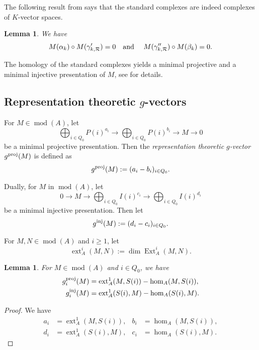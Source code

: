 \documentclass[12pt,reqno]{amsart}
\newtheorem{Lem}[Thm]{Lemma}
\theoremstyle{definition}
\newcommand{\cR}{{\mathcal R}}
\newcommand{\md}{\operatorname{mod}}
\newcommand{\Ext}{\operatorname{Ext}}
\newcommand{\ext}{\operatorname{ext}}
\begin{document}
The following result from \cite[Section~5]{GHLS26} says that the standard complexes are indeed 
complexes of $K$-vector spaces.

\begin{Lem}\label{lem:complex1}
We have
$$
M(\alpha_k) \circ M(\gamma_{k,\cR}') = 0 
\text{\quad and \quad}
M(\gamma_{k,\cR}'') \circ M(\beta_k) = 0.
$$
\end{Lem}

The homology of the standard complexes yields a minimal
projective and a minimal injective presentation of $M$, see \cite[Theorem~1.1]{GHLS26} for details.



\subsection{Representation theoretic $g$-vectors}
For $M \in \md(A)$, let
\[
\bigoplus_{i \in Q_0} P(i)^{a_i} \to 
\bigoplus_{i \in Q_0} P(i)^{b_i} \to M \to 0
\]
be a minimal projective presentation.
Then the \emph{representation theoretic $g$-vector} $g^{\rm proj}(M)$ is defined as
$$
g^{\rm proj}(M) := (a_i-b_i)_{i \in Q_0}.
$$

Dually, for $M$ in $\md(A)$,
let
\[
0 \to M \to \bigoplus_{i \in Q_0} I(i)^{c_i} \to \bigoplus_{i \in Q_0} 
I(i)^{d_i} 
\]
be a minimal injective presentation. 
Then let 
$$
g^{\rm inj}(M) := (d_i-c_i)_{i \in Q_0}.
$$

For $M,N \in \md(A)$ and $i \ge 1$, let
$$
\ext_A^i(M,N) := \dim \Ext_A^i(M,N).
$$

\begin{Lem}\label{lem:gvector1}
For $M \in \md(A)$ and $i \in Q_0$, we have
\begin{align*}
g_i^{\rm proj}(M) &= \ext_A^1(M,S(i)) - \hom_A(M,S(i)),
\\
g_i^{\rm inj}(M) &= \ext_A^1(S(i),M) - \hom_A(S(i),M).
\end{align*}
\end{Lem}

\begin{proof}
We have 
\begin{align*}
a_i &= \ext_A^1(M,S(i)),  & b_i &= \hom_A(M,S(i)),
\\ 
d_i &= \ext_A^1(S(i),M), 
& c_i &= \hom_A(S(i),M).
\end{align*}
\end{proof}

\end{document}
